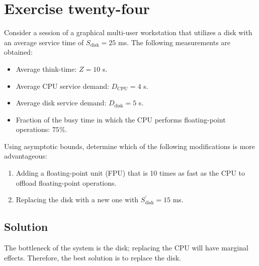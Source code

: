 \section{Exercise twenty-four}

Consider a session of a graphical multi-user workstation that utilizes a disk with an average service time of $S_{\text{disk}}=25$ ms. 
The following measurements are obtained:
\begin{itemize}
    \item Average think-time: $Z=10$ s.
    \item Average CPU service demand: $D_{\text{CPU}}=4$ s.
    \item Average disk service demand: $D_{\text{disk}}=5$ s.
    \item Fraction of the busy time in which the CPU performs floating-point operations: $75\%$.
\end{itemize}
Using asymptotic bounds, determine which of the following modifications is more advantageous:
\begin{enumerate}
    \item Adding a floating-point unit (FPU) that is 10 times as fast as the CPU to offload floating-point operations.
    \item Replacing the disk with a new one with $S^\prime_{\text{disk}}=15$ ms.
\end{enumerate}

\subsection*{Solution}
The bottleneck of the system is the disk; replacing the CPU will have marginal effects. 
Therefore, the best solution is to replace the disk.